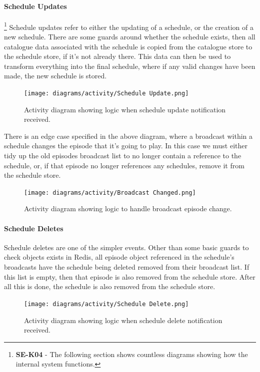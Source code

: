   \newpage
  \paragraph{Schedule Updates}
  \footnote{\textbf{SE-K04} - The following section shows countless diagrams showing how the internal system functions.}
  Schedule updates refer to either the updating of a schedule, or the creation of a new schedule. There are some guards around whether the 
  schedule exists, then all catalogue data associated with the schedule is copied from the catalogue store to the schedule store, if it's 
  not already there. This data can then be used to transform everything into the final schedule, where if any valid changes have been made, the 
  new schedule is stored.

  \begin{figure}[H]
    \centering
    \texttt{[image: diagrams/activity/Schedule Update.png]}
    \caption{Activity diagram showing logic when schedule update notification received.}
    \label{fig:scheduleUpdateActivity}
  \end{figure}

  There is an edge case specified in the above diagram, where a broadcast within a schedule changes the episode that it's going to play. 
  In this case we must either tidy up the old episodes broadcast list to no longer contain a reference to the schedule, or, if that episode no 
  longer references any schedules, remove it from the schedule store.

  \begin{figure}[H]
    \centering
    \texttt{[image: diagrams/activity/Broadcast Changed.png]}
    \caption{Activity diagram showing logic to handle broadcast episode change.}
    \label{fig:broadCastChangeActivity}
  \end{figure}

  \newpage
  \paragraph{Schedule Deletes}
  Schedule deletes are one of the simpler events. Other than some basic guards to check objects exists in Redis, all episode object referenced in 
  the schedule's broadcasts have the schedule being deleted removed from their broadcast list. If this list is empty, then that episode is also removed
  from the schedule store. After all this is done, the schedule is also removed from the schedule store.

  \begin{figure}[H]
    \centering
    \texttt{[image: diagrams/activity/Schedule Delete.png]}
    \caption{Activity diagram showing logic when schedule delete notification received.}
    \label{fig:scheduleDeleteActivity}
  \end{figure}


